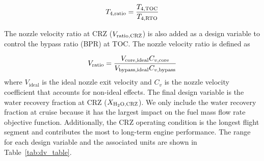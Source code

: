 \documentclass[conf]{new-aiaa}
\begin{document}
\begin{equation}
  T_{4,\rm{ratio}} = \frac{T_{4,\rm{TOC}}}{T_{4,\rm{RTO}}}
  \label{t4ratio}
\end{equation}

\noindent
The nozzle velocity ratio at CRZ ($V_{\rm{ratio,CRZ}}$) is also added as a design variable to control the bypass ratio (BPR) at TOC.
The nozzle velocity ratio is defined as

\begin{equation}
  V_{\rm{ratio}} = \frac{V_{\rm{core,ideal}}C_{v,\rm{core}}}{V_{\rm{bypass,ideal}}C_{v,\rm{bypass}}}
  \label{eq:vratio}
\end{equation}
where $V_\text{ideal}$ is the ideal nozzle exit velocity and $C_v$ is the nozzle velocity coefficient that accounts for non-ideal effects.
The final design variable is the water recovery fraction at CRZ ($X_{\rm{H_2O,CRZ}}$).
We only include the water recovery fraction at cruise because it has the largest impact on the fuel mass flow rate objective function.
Additionally, the CRZ operating condition is the longest flight segment and contributes the most to long-term engine performance.
The range for each design variable and the associated units are shown in Table~\ref{tab:dv_table}.
\end{document}
